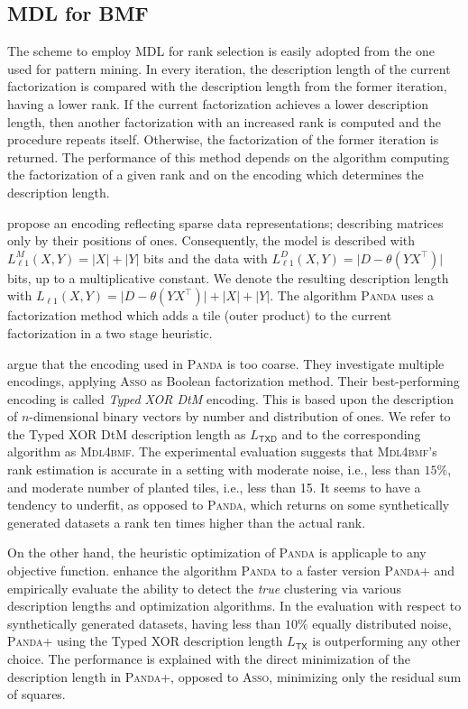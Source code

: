 \subsection{MDL for BMF}
The scheme to employ MDL for rank selection is easily adopted from the one used for pattern mining. 
In every iteration, the description length of the current factorization is compared with the description length from the former iteration, having a lower rank. If the current factorization achieves a lower description length, then another factorization with an increased rank is computed and the procedure repeats itself. Otherwise, the factorization of the former iteration is returned. The performance of this method depends on the algorithm computing the factorization of a given rank and on the encoding which determines the description length.

\cite{lucchese2010noise} propose an encoding reflecting sparse data representations; describing matrices only by their positions of ones. Consequently, the model is described with $L^M_{\ell 1}(X,Y)=\lvert X\rvert +\lvert Y\rvert $ bits and the data with $L^D_{\ell 1}(X,Y)=\lvert D-\theta(YX^\top )\rvert $ bits, up to a multiplicative constant. We denote the resulting description length with $L_{\ell 1}(X,Y)=\lvert D-\theta(YX^\top )\rvert +\lvert X\rvert +\lvert Y\rvert $. The algorithm \textsc{Panda} uses a factorization method which adds a tile (outer product) to the current factorization in a two stage heuristic. 
 
\cite{miettinen2014mdl4bmf} argue that the encoding used in \textsc{Panda} is too coarse. They investigate multiple encodings, applying \textsc{Asso} as Boolean factorization method. Their best-performing encoding is called \emph{Typed XOR DtM} encoding. This is based upon the description of $n$-dimensional binary vectors by number and distribution of ones. 
We refer to  the Typed XOR DtM description length as $L_{\mathsf{TXD}}$ and to the corresponding algorithm as \textsc{Mdl4bmf}. The experimental evaluation suggests that \textsc{Mdl4bmf}'s rank estimation is accurate in a setting with moderate noise, i.e., less than $15\%$, and moderate number of planted tiles, i.e., less than 15. It seems to have a tendency to underfit, as opposed to \textsc{Panda}, which returns on some synthetically generated datasets a rank ten times higher than the actual rank.

On the other hand, the heuristic optimization of \textsc{Panda} is applicaple to any objective function. \cite{lucchese2014unifying} enhance the algorithm \textsc{Panda} to a faster version \textsc{Panda+} and empirically evaluate the ability to detect the \emph{true} clustering via various description lengths and optimization algorithms. In the evaluation with respect to synthetically generated datasets, having less than $10\%$ equally distributed noise, \textsc{Panda+} using the Typed XOR description length $L_{\mathsf{TX}}$ is outperforming any other choice. The performance is explained with the direct minimization of the description length in \textsc{Panda+}, opposed to \textsc{Asso}, minimizing only the residual sum of squares.

